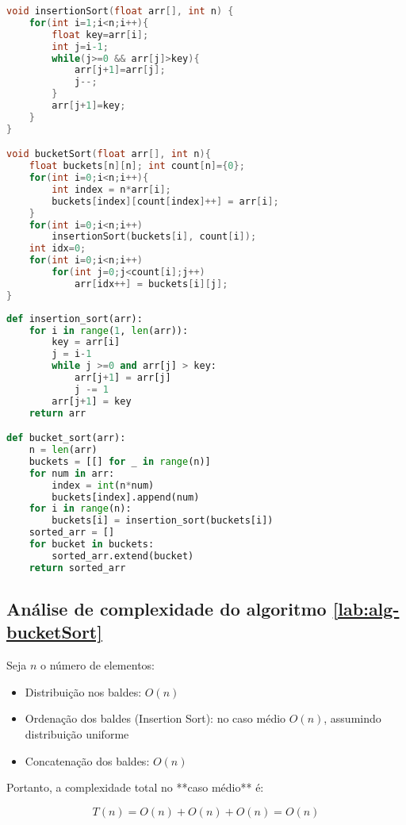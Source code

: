 \begin{lstlisting}[language=C,caption={Bucket sort em C},captionpos=t]
void insertionSort(float arr[], int n) {
    for(int i=1;i<n;i++){
        float key=arr[i];
        int j=i-1;
        while(j>=0 && arr[j]>key){
            arr[j+1]=arr[j];
            j--;
        }
        arr[j+1]=key;
    }
}

void bucketSort(float arr[], int n){
    float buckets[n][n]; int count[n]={0};
    for(int i=0;i<n;i++){
        int index = n*arr[i];
        buckets[index][count[index]++] = arr[i];
    }
    for(int i=0;i<n;i++)
        insertionSort(buckets[i], count[i]);
    int idx=0;
    for(int i=0;i<n;i++)
        for(int j=0;j<count[i];j++)
            arr[idx++] = buckets[i][j];
}
\end{lstlisting}

\begin{lstlisting}[language=Python,caption={Bucket sort em Python},captionpos=t]
def insertion_sort(arr):
    for i in range(1, len(arr)):
        key = arr[i]
        j = i-1
        while j >=0 and arr[j] > key:
            arr[j+1] = arr[j]
            j -= 1
        arr[j+1] = key
    return arr

def bucket_sort(arr):
    n = len(arr)
    buckets = [[] for _ in range(n)]
    for num in arr:
        index = int(n*num)
        buckets[index].append(num)
    for i in range(n):
        buckets[i] = insertion_sort(buckets[i])
    sorted_arr = []
    for bucket in buckets:
        sorted_arr.extend(bucket)
    return sorted_arr
\end{lstlisting}

\subsection{Análise de complexidade do algoritmo \ref{lab:alg-bucketSort}}

Seja $n$ o número de elementos:

\begin{itemize}
    \item Distribuição nos baldes: $O(n)$
    \item Ordenação dos baldes (Insertion Sort): no caso médio $O(n)$, assumindo distribuição uniforme
    \item Concatenação dos baldes: $O(n)$
\end{itemize}

Portanto, a complexidade total no **caso médio** é:

\[
T(n) = O(n) + O(n) + O(n) = O(n)
\]

